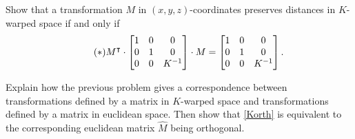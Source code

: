 \documentclass[newpage,hints,handout]{ximera}
\begin{document}
\begin{problem}
  Show that a transformation $M$ in $(x,y,z)$-coordinates preserves distances in
  $K$-warped space if and only if%
  \begin{equation} \label{Korth}\tag{$*$}
    M^\intercal \cdot\begin{bmatrix}
    1 & 0 & 0\\
    0 & 1 & 0\\
    0 & 0 & K^{-1}
    \end{bmatrix}
    \cdot M=\begin{bmatrix}
    1 & 0 & 0\\
    0 & 1 & 0\\
    0 & 0 & K^{-1}
    \end{bmatrix}. 
  \end{equation}
\begin{hint} 
  Explain how the previous problem gives a correspondence between
  transformations defined by a matrix in $K$-warped space and transformations
  defined by a matrix in euclidean space.  Then show that \eqref{Korth} is
  equivalent to the corresponding euclidean matrix $\hat{M}$ being orthogonal. 
\end{hint}
  


\end{problem}
\end{document}
